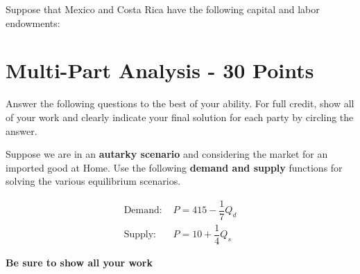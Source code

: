 \documentclass[12pt]{exam}
\begin{document}
\begin{questions}
\question
Suppose that Mexico and Costa Rica have the following capital and labor endowments:



\newpage
\section*{Multi-Part Analysis - 30 Points}
Answer the following questions to the best of your ability.
For full credit, show all of your work and clearly indicate your final solution for each party by circling the answer.

\question
Suppose we are in an \textbf{autarky scenario} and considering the market for an imported good at Home. 
Use the following \textbf{demand and supply} functions for solving the various equilibrium scenarios.

\begin{align*}
    \text{Demand: }& P = 415 - \dfrac{1}{7}Q_{d} \\
    \text{Supply: }& P = 10 + \dfrac{1}{4}Q_{s}
\end{align*}

\textbf{Be sure to show all your work}

\end{questions}
\end{document}
